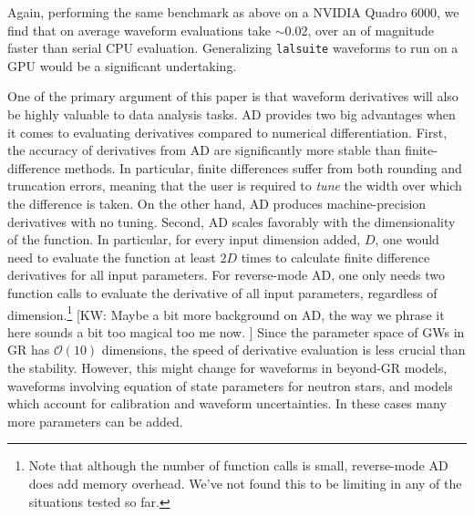 \documentclass[twocolumn]{aastex631}
\newcommand{\lalsuite}{\texttt{lalsuite}\xspace}
\newcommand{\te}[1]{\textbf{\color{pyGreen}(TE: #1)}}
\newcommand{\kw}[1]{{\color{rb4}[KW: #1 ]}}
\newcommand{\amc}[1]{{\color{red}[AC: #1]}}
\begin{document}

Again, performing the same benchmark as above on a NVIDIA Quadro 6000, we find that on average waveform evaluations take $\sim 0.02$, over an of magnitude faster than serial CPU evaluation.
Generalizing \lalsuite waveforms to run on a GPU would be a significant undertaking.

One of the primary argument of this paper is that waveform derivatives will also be highly valuable to data analysis tasks. 
AD provides two big advantages when it comes to evaluating derivatives compared to numerical differentiation.
First, the accuracy of derivatives from AD are significantly more stable than finite-difference methods.
In particular, finite differences suffer from both rounding and truncation errors, meaning that the user is required to \textit{tune} the width over which the difference is taken.
On the other hand, AD produces machine-precision derivatives with no tuning.
Second, AD scales favorably with the dimensionality of the function.
In particular, for every input dimension added, $D$, one would need to evaluate the function at least $2D$ times to calculate finite difference derivatives for all input parameters.
For reverse-mode AD, one only needs two function calls to evaluate the derivative of all input parameters, regardless of dimension.\footnote{
    Note that although the number of function calls is small, reverse-mode AD does add memory overhead.
    We've not found this to be limiting in any of the situations tested so far.
}
\kw{Maybe a bit more background on AD, the way we phrase it here sounds a bit too magical too me now.}
Since the parameter space of GWs in GR has $\mathcal{O}(10)$ dimensions, the speed of derivative evaluation is less crucial than the stability.
However, this might change for waveforms in beyond-GR models, waveforms involving equation of state parameters for neutron stars, and models which account for calibration and waveform uncertainties.
In these cases many more parameters can be added.
\end{document}
